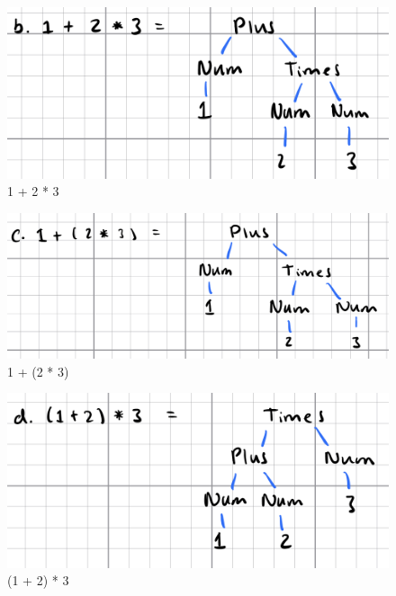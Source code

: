 \documentclass{article}
\theoremstyle{theorem}
\theoremstyle{definition}
\theoremstyle{remark}
\begin{document}
\begin{figure}[H]
\begin{center}
\includegraphics[scale=0.4]{img/A2.png}
\end{center}
\caption{1 + 2 * 3}\label{A2}
\end{figure}

\begin{figure}[H]
\begin{center}
\includegraphics[scale=0.4]{img/A3.png}
\end{center}
\caption{1 + (2 * 3)}\label{A3}
\end{figure}

\begin{figure}[H]
\begin{center}
\includegraphics[scale=0.4]{img/A4.png}
\end{center}
\caption{(1 + 2) * 3}\label{A4}
\end{figure}
\end{document}
